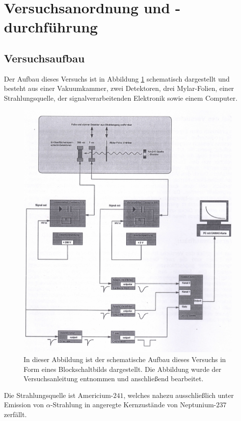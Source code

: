 \section{Versuchsanordnung und -durchführung}

\subsection{Versuchsaufbau}

Der Aufbau dieses Versuchs ist in Abbildung \ref{Aufbau} schematisch dargestellt und besteht aus einer Vakuumkammer, zwei Detektoren, drei Mylar-Folien, einer Strahlungsquelle, der signalverarbeitenden Elektronik sowie einem Computer.
\begin{figure}[H]
	\centering
	\includegraphics[width=1.0\textwidth]{img/Aufbau}
	\caption{In dieser Abbildung ist der schematische Aufbau dieses Versuchs in Form eines Blockschaltbilds dargestellt. Die Abbildung wurde der Versuchsanleitung\cite{wwu} entnommen und anschließend bearbeitet.}
	\label{Aufbau}
\end{figure}
\noindent Die Strahlungsquelle ist Americium-$241$, welches nahezu ausschließlich unter Emission von $\alpha$-Strahlung in angeregte Kernzustände von Neptunium-$237$ zerfällt.
